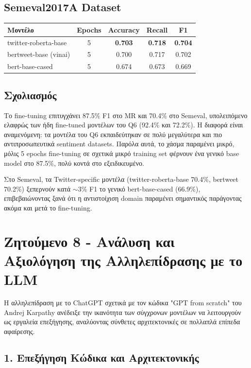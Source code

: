 \documentclass[12pt]{article}
\begin{document}
\subsection{Semeval2017A Dataset}

\begin{center}
\begin{tabular}{lcccc}
\toprule
Μοντέλο & Epochs & Accuracy & Recall & F1 \\
\midrule
twitter-roberta-base & 5 & \textbf{0.703} & \textbf{0.718} & \textbf{0.704} \\
bertweet-base (vinai) & 5 & 0.700 & 0.717 & 0.702 \\
bert-base-cased & 5 & 0.674 & 0.673 & 0.669 \\
\bottomrule
\end{tabular}
\end{center}

\subsection{Σχολιασμός}

Το fine-tuning επιτυγχάνει 87.5\% F1 στο MR και 70.4\% στο Semeval,
υπολειπόμενο ελαφρώς των ήδη fine-tuned μοντέλων του Q6 (92.4\% και
72.2\%). Η διαφορά είναι αναμενόμενη: τα μοντέλα του Q6 εκπαιδεύτηκαν
σε πολύ μεγαλύτερα και πιο αντιπροσωπευτικά sentiment datasets.
Παρόλα αυτά, το χάσμα παραμένει μικρό, μόλις 5 epochs fine-tuning
σε σχετικά μικρό training set φέρνουν ένα γενικό base model στο 87.5\%,
πολύ κοντά στο εξειδικευμένο.

Στο Semeval, τα Twitter-specific μοντέλα (twitter-roberta-base 70.4\%,
bertweet 70.2\%) ξεπερνούν κατά $\sim$3\% F1 το γενικό bert-base-cased
(66.9\%), επιβεβαιώνοντας ξανά ότι η αντιστοίχιση domain
παραμένει σημαντικός παράγοντας ακόμα και μετά το fine-tuning.



\section*{Ζητούμενο 8 - Ανάλυση και Αξιολόγηση της Αλληλεπίδρασης με το LLM}
Η αλληλεπίδραση με το ChatGPT σχετικά με τον κώδικα "GPT from scratch" του Andrej Karpathy ανέδειξε την ικανότητα των σύγχρονων μοντέλων να λειτουργούν ως εργαλεία επεξήγησης, αναλύοντας σύνθετες αρχιτεκτονικές σε πολλαπλά επίπεδα αφαίρεσης.

\subsection*{1. Επεξήγηση Κώδικα και Αρχιτεκτονικής}
\end{document}
